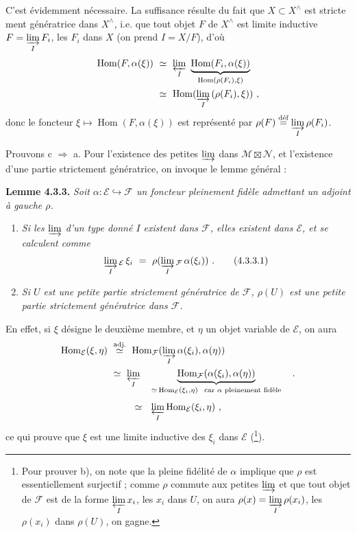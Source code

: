 \documentclass[11pt]{article}
\newcommand{\printedpage}[1]{\marginpar{\footnotesize p.~#1}}
\newcommand{\msp}[1]{\marginpar{\footnotesize [#1]}}
\newcommand{\Hom}{\operatorname{Hom}}
\begin{document}
\noindent C'est évidemment nécessaire. La suffisance résulte du fait que $X\subset X^\wedge$ est stricte%
\printedpage{10}%
\msp{page 67}%
ment génératrice dans $X^\wedge$, i.e. que tout objet $F$ de $X^\wedge$ est limite inductive $F=\varinjlim\limits_I F_i$, les $F_i$ dans $X$ (on prend $I=X/F$), d'où
\[
\begin{aligned}
\Hom(F,\alpha(\xi))\ &\simeq\ \varprojlim_I\ \underbrace{\Hom(F_i,\alpha(\xi))}_{\Hom(\rho(F_i),\xi)}\\
&\simeq\ \Hom(\varinjlim_I\,(\rho(F_i),\xi))\ ,
\end{aligned}
\]
donc le foncteur $\xi\longmapsto\Hom(F,\alpha(\xi))$ est représenté par $\rho(F)\overset{\text{déf}}{=}\varinjlim\limits_I\rho(F_i)$.

\noindent Prouvons c $\Longrightarrow$ a. Pour l'existence des petites $\varinjlim$ dans $\mathcal M\boxtimes\mathcal N$, et l'existence d'une partie strictement génératrice, on invoque le lemme général :

\noindent\textbf{Lemme 4.3.3.} \textit{Soit $\alpha:\mathcal E\hookrightarrow\mathcal F$ un foncteur pleinement fidèle admettant un adjoint à gauche $\rho$.}
\begin{enumerate}[label={}]
\item[\textcircled{a}] \textit{Si les $\varinjlim$ d'un type donné $I$ existent dans $\mathcal F$, elles existent dans $\mathcal E$, et se calculent comme}
\[
\varinjlim_I{}_{\mathcal E}\,\xi_i\ =\ \rho(\varinjlim_I{}_{\mathcal F}\,\alpha(\xi_i))\ .
\tag*{(4.3.3.1)}
\]
\item[\textcircled{b}] \textit{Si $U$ est une petite partie strictement génératrice de $\mathcal F$, $\rho(U)$ est une petite partie strictement génératrice dans $\mathcal F$.}
\end{enumerate}

\noindent En effet, si $\xi$ désigne le deuxième membre, et $\eta$ un objet variable de $\mathcal E$, on aura
\[
\begin{aligned}
\Hom_{\mathcal E}(\xi,\eta)\ &\overset{\text{adj.}}{\simeq}\ \Hom_{\mathcal F}(\varinjlim_I\alpha(\xi_i),\alpha(\eta))\\
&\simeq\ \varprojlim_I\quad\underbrace{\Hom_{\mathcal F}(\alpha(\xi_i),\alpha(\eta))}_{\simeq\,\Hom_{\mathcal E}(\xi_i,\eta)\ \ \text{car $\alpha$ pleinement fidèle}}\quad .
\end{aligned}
\]
\msp{page 68}
\[
\simeq\ \ \varprojlim_I\Hom_{\mathcal E}(\xi_i,\eta)\ ,
\]
ce qui prouve que $\xi$ est une limite inductive des $\xi_i$ dans $\mathcal E$ (\footnote{Pour prouver b), on note que la pleine fidélité de $\alpha$ implique que $\rho$ est essentiellement surjectif ; comme $\rho$ commute aux petites $\varinjlim$ et que tout objet de $\mathcal F$ est de la forme $\varprojlim\limits_I x_i$, les $x_i$ dans $U$, on aura $\rho(x)=\varinjlim\limits_I\rho(x_i)$, les $\rho(x_i)$ dans $\rho(U)$, on gagne.}).
\end{document}
